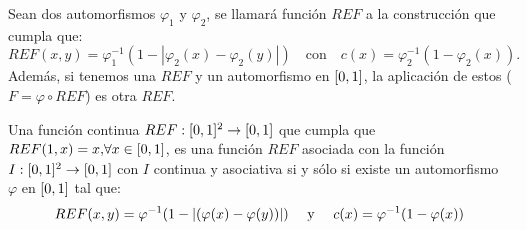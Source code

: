 \documentclass[main]{subfiles}
\begin{document}
\begin{proposition}\label{prop:contruccionref}
Sean dos automorfismos $\varphi_{1}$ y $\varphi_{2}$, se llamará función $REF$ a la construcción que cumpla que:
$$REF(x,y) = \varphi_1^{-1}(1-|\varphi_2(x)-\varphi_2(y)|) \quad\text{con}\quad c(x) = \varphi_2^{-1}(1-\varphi_2(x)).$$
Además, si tenemos una $REF$ y un automorfismo en $[0,1]$, la aplicación de estos (${F=\varphi \circ REF}$) es otra $REF$.
\end{proposition}

\begin{theorem}\label{th:ref}
Una función continua ${REF:[0,1]^2 \rightarrow[0,1]}$ que cumpla que ${REF(1,x)=x,} \forall x\in[0,1]$, es una función $REF$ asociada con la función ${I:[0,1]^2\rightarrow[0,1]}$ con $I$ continua y asociativa si y sólo si existe un automorfismo $\varphi$ en $[0,1]$ tal que:
$$REF(x,y)=\varphi^{-1}(1-\left\vert(\varphi(x)-\varphi(y))\right\vert)\quad\text{ y }\quad c(x)=\varphi^{-1}(1-\varphi(x))$$
\end{theorem}

\end{document}

